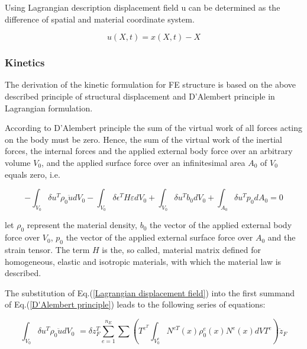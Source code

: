 Using Lagrangian description displacement field u can be determined
as the difference of spatial and material coordinate system.

\begin{equation}
u(X,t)=x(X,t)-X\label{Lagrangian displacement field}
\end{equation}







\subsubsection{Kinetics \citep{FEM}}

The derivation of the kinetic formulation for FE structure is based
on the above described principle of structural displacement and D\textquoteright Alembert
principle in Lagrangian formulation.

According to D\textquoteright Alembert principle the sum of the virtual
work of all forces acting on the body must be zero. Hence, the sum
of the virtual work of the inertial forces, the internal forces and
the applied external body force over an arbitrary volume $V_{0}$,
and the applied surface force over an infinitesimal area $A_{0}$
of $V_{0}$ equals zero, i.e.


\begin{equation}
-\int_{V_{0}} \delta u^{T}\rho_{0}\textbf{$\ddot{u}$}dV_{0}-\int_{V_{0}}\delta\epsilon^{T}H\varepsilon dV_{0}+\int_{V_{0}}\delta u^{T} b_{0}dV_{0}+\int_{A_{0}}\delta u^{T}p_{0}dA_{0}=0\label{D'Alembert principle}
\end{equation}


let $\rho_{0}$ represent the material density, $b_{0}$ the vector
of the applied external body force over $V_{0}$, $p_{0}$ the vector
of the applied external surface force over $A_{0}$ and the strain
tensor. The term $H$ is the, so called, material matrix defined for
homogeneous, elastic and isotropic materials, with which the material
law is described.

The substitution of Eq.(\ref{Lagrangian displacement field}) into
the first summand of Eq.(\ref{D'Alembert principle}) leads to the
following series of equations: 

\begin{equation}
\int_{V_{0}}\delta u^{T}\rho_{0}\textbf{$\ddot{u}$}dV_{0}\,\,=\delta z_{F}^{T}\sum_{e=1}^{n_{E}}{\sum}\left(T^{e^{T}}\int_{V_{0}^{e}}N^{eT}(x)\rho_{0}^{e}(x)N^{e}(x)dVT^{e}\right)\ddot{z}_{F}
\end{equation}


